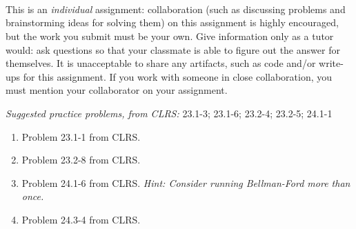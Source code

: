 \documentclass[letterpaper,11pt]{article}
\begin{document}


 \\

 \\
 \\

This is an \emph{individual} assignment: collaboration (such as discussing problems and brainstorming ideas for solving them) on this assignment is highly encouraged, but the work you submit must be your own. Give information only as a tutor would: ask questions so that your classmate is able to figure out the answer for themselves. It is unacceptable to share any artifacts, such as code and/or write-ups for this assignment. If you work with someone in close collaboration, you must mention your collaborator on your assignment.

\emph{Suggested practice problems, from CLRS:} 23.1-3; 23.1-6; 23.2-4; 23.2-5; 24.1-1

\begin{enumerate}
\item Problem 23.1-1 from CLRS.
\item Problem 23.2-8 from CLRS.
\item Problem 24.1-6 from CLRS. \emph{Hint: Consider running Bellman-Ford more than once.}
\item Problem 24.3-4 from CLRS.

\end{enumerate}
\end{document}
